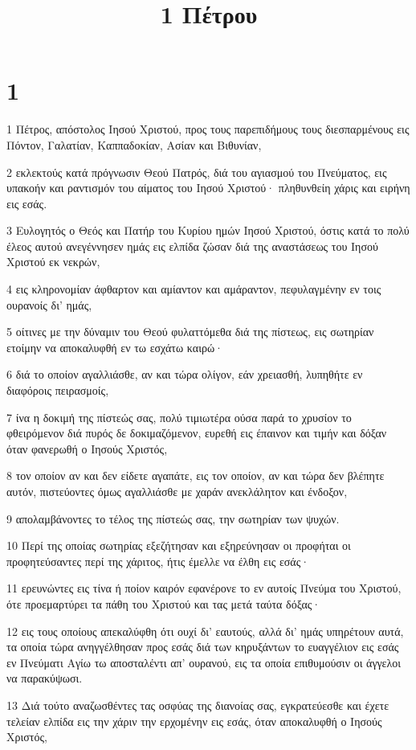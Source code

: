 

\title{1 Πέτρου}


\chapter{1}

\par 1 Πέτρος, απόστολος Ιησού Χριστού, προς τους παρεπιδήμους τους διεσπαρμένους εις Πόντον, Γαλατίαν, Καππαδοκίαν, Ασίαν και Βιθυνίαν,
\par 2 εκλεκτούς κατά πρόγνωσιν Θεού Πατρός, διά του αγιασμού του Πνεύματος, εις υπακοήν και ραντισμόν του αίματος του Ιησού Χριστού· πληθυνθείη χάρις και ειρήνη εις εσάς.
\par 3 Ευλογητός ο Θεός και Πατήρ του Κυρίου ημών Ιησού Χριστού, όστις κατά το πολύ έλεος αυτού ανεγέννησεν ημάς εις ελπίδα ζώσαν διά της αναστάσεως του Ιησού Χριστού εκ νεκρών,
\par 4 εις κληρονομίαν άφθαρτον και αμίαντον και αμάραντον, πεφυλαγμένην εν τοις ουρανοίς δι' ημάς,
\par 5 οίτινες με την δύναμιν του Θεού φυλαττόμεθα διά της πίστεως, εις σωτηρίαν ετοίμην να αποκαλυφθή εν τω εσχάτω καιρώ·
\par 6 διά το οποίον αγαλλιάσθε, αν και τώρα ολίγον, εάν χρειασθή, λυπηθήτε εν διαφόροις πειρασμοίς,
\par 7 ίνα η δοκιμή της πίστεώς σας, πολύ τιμιωτέρα ούσα παρά το χρυσίον το φθειρόμενον διά πυρός δε δοκιμαζόμενον, ευρεθή εις έπαινον και τιμήν και δόξαν όταν φανερωθή ο Ιησούς Χριστός,
\par 8 τον οποίον αν και δεν είδετε αγαπάτε, εις τον οποίον, αν και τώρα δεν βλέπητε αυτόν, πιστεύοντες όμως αγαλλιάσθε με χαράν ανεκλάλητον και ένδοξον,
\par 9 απολαμβάνοντες το τέλος της πίστεώς σας, την σωτηρίαν των ψυχών.
\par 10 Περί της οποίας σωτηρίας εξεζήτησαν και εξηρεύνησαν οι προφήται οι προφητεύσαντες περί της χάριτος, ήτις έμελλε να έλθη εις εσάς·
\par 11 ερευνώντες εις τίνα ή ποίον καιρόν εφανέρονε το εν αυτοίς Πνεύμα του Χριστού, ότε προεμαρτύρει τα πάθη του Χριστού και τας μετά ταύτα δόξας·
\par 12 εις τους οποίους απεκαλύφθη ότι ουχί δι' εαυτούς, αλλά δι' ημάς υπηρέτουν αυτά, τα οποία τώρα ανηγγέλθησαν προς εσάς διά των κηρυξάντων το ευαγγέλιον εις εσάς εν Πνεύματι Αγίω τω αποσταλέντι απ' ουρανού, εις τα οποία επιθυμούσιν οι άγγελοι να παρακύψωσι.
\par 13 Διά τούτο αναζωσθέντες τας οσφύας της διανοίας σας, εγκρατεύεσθε και έχετε τελείαν ελπίδα εις την χάριν την ερχομένην εις εσάς, όταν αποκαλυφθή ο Ιησούς Χριστός,
